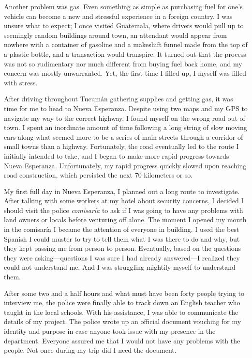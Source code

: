Another problem was gas. Even something as simple as purchasing fuel for one’s vehicle can become a new and stressful experience in a foreign country. I was unsure what to expect; I once visited Guatemala, where drivers would pull up to seemingly random buildings around town, an attendant would appear from nowhere with a container of gasoline and a makeshift funnel made from the top of a plastic bottle, and a transaction would transpire. It turned out that the process was not so rudimentary nor much different from buying fuel back home, and my concern was mostly unwarranted. Yet, the first time I filled up, I myself was filled with stress.

After driving throughout Tucumán gathering supplies and getting gas, it was time for me to head to Nueva Esperanza. Despite using two maps and my GPS to navigate my way to the correct highway, I found myself on the wrong road out of town. I spent an inordinate amount of time following a long string of slow moving cars along what seemed more to be a series of main streets through a corridor of small towns than a highway. Fortunately, the road eventually led to the route I initially intended to take, and I began to make more rapid progress towards Nueva Esperanza.
Unfortunately, my rapid progress quickly slowed upon reaching road construction, which persisted the next 70 kilometers or so.

My first full day in Nueva Esperanza, I planned out a long route to investigate. After talking with some workers at my hotel about security concerns, I decided I should visit the police \textit{comisaría} to ask if I was going to have any problems with land owners or locals before venturing off alone. The moment I opened my mouth in the comisaría I became the attention of everyone in building. I used the best Spanish I could muster to try to tell them what I was there to do and why, but they kept passing me from person to person. Eventually, based on the questions they were asking---questions I was sure I had already answered---I realized they could not understand me. And I was struggling mightily myself to understand them.

After some two and a half hours and what must have been forty people trying to interview me, the police were finally able to track down an English teacher who taught in the local schools. With his assistance, I was able to communicate the details of my project. The police wrote up an official document vouching for my identity and purpose in case anyone took issue with my presence in the department. Everyone assured me that I would not have any problems with the people. Not once during my trip did I need the document.

